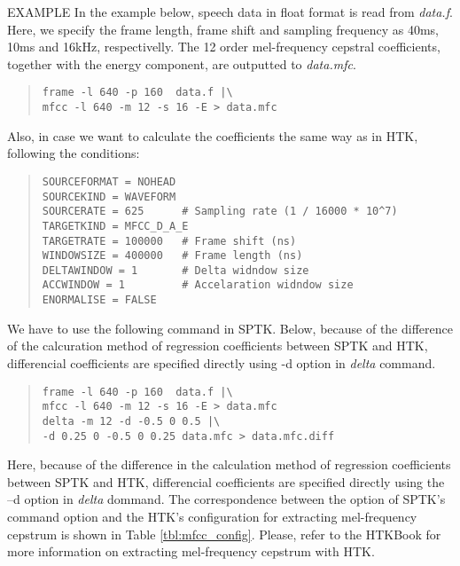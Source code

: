 \begin{qsection}{EXAMPLE}
In the example below, speech data in float format is read from
{\em data.f}. 
Here, we specify the frame length, frame shift and sampling frequency as
40ms, 10ms and 16kHz, respectivelly. The 12 order mel-frequency
cepstral coefficients, together with the energy component, are
outputted to {\em data.mfc}.
\begin{quote}
  \verb!frame -l 640 -p 160  data.f |\                        ! \\
  \verb!mfcc -l 640 -m 12 -s 16 -E > data.mfc                  ! \\
\end{quote}

Also, in case we want to calculate the coefficients the same way as in
HTK, following the conditions:
\begin{quote}
  \verb!SOURCEFORMAT = NOHEAD! \\
  \verb!SOURCEKIND = WAVEFORM ! \\
  \verb!SOURCERATE = 625      # Sampling rate (1 / 16000 * 10^7)!\\
  \verb!TARGETKIND = MFCC_D_A_E ! \\
  \verb!TARGETRATE = 100000   # Frame shift (ns)! \\
  \verb!WINDOWSIZE = 400000   # Frame length (ns)! \\
  \verb!DELTAWINDOW = 1       # Delta widndow size! \\
  \verb!ACCWINDOW = 1         # Accelaration widndow size! \\
  \verb!ENORMALISE = FALSE ! \\
\end{quote}
We have to use the following command in SPTK. Below, because of the difference of the
calcuration method of regression coefficients between SPTK and HTK,
differencial coefficients are specified directly using -d option in
{\em delta} command. 
\begin{quote}
  \verb!frame -l 640 -p 160  data.f |\                        ! \\
  \verb!mfcc -l 640 -m 12 -s 16 -E > data.mfc                  ! \\
  \verb!delta -m 12 -d -0.5 0 0.5 |\ ! \\
  \verb!-d 0.25 0 -0.5 0 0.25 data.mfc > data.mfc.diff! \\
\end{quote}
Here, because of the difference in the calculation method of
regression coefficients between SPTK and HTK, differencial
coefficients are specified directly using the --d option in {\em
  delta} dommand.
The correspondence between the option of SPTK's command option and the
HTK's configuration for extracting mel-frequency cepstrum is shown in Table
\ref{tbl:mfcc_config}. Please, refer to the HTKBook for more
information on extracting mel-frequency cepstrum with HTK.


\end{qsection}
